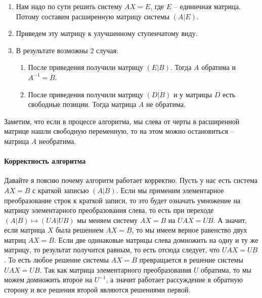 \begin{enumerate}
\item Нам надо по сути решить систему $AX = E$, где $E$ -- единичная матрица.
Потому составим расширенную матрицу системы $(A|E)$.

\item Приведем эту матрицу к улучшенному ступенчатому виду.

\item В результате возможны $2$ случая:
\begin{enumerate}
\item После приведения получили матрицу $(E|B)$.
Тогда $A$ обратима и $A^{-1} = B$.

\item После приведения получили матрицу $(D|B)$ и у матрицы $D$ есть свободные позиции.
Тогда матрица $A$ не обратима.
\end{enumerate}
\end{enumerate}
Заметим, что если в процессе алгоритма, мы слева от черты в расширенной матрице нашли свободную переменную, то на этом можно остановиться -- матрица $A$ необратима.

\paragraph{Корректность алгоритма}

Давайте я поясню почему алгоритм работает корректно.
Пусть у нас есть система $AX  = B$ с краткой записью $(A|B)$.
Если мы применим элементарное преобразование строк к краткой записи, то это будет означать умножение на матрицу элементарного преобразования слева, то есть при переходе $(A|B)\mapsto (UA|UB)$ мы меняем систему $AX = B$ на $UAX = UB$.
А значит, если матрица $X$ была решением $AX = B$, то мы имеем верное равенство двух матриц $AX = B$.
Если две одинаковые матрицы слева домножить на одну и ту же матрицу, то результат получится равным, то есть отсюда следует, что $UAX = UB$.
То есть любое решение системы $AX = B$ превращается в решение системы $UAX = UB$.
Так как матрица элементарного преобразования $U$ обратима, то мы можем домножить второе на $U^{-1}$, а значит работает рассуждение в обратную сторону и все решения второй являются решениями первой.

